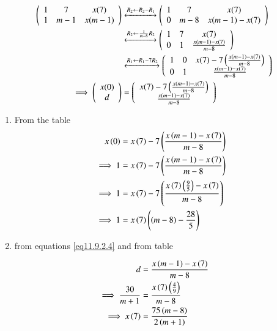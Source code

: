 \documentclass[journal,12pt,onecolumn]{IEEEtran}
\theoremstyle{remark}
\begin{document}
\begin{align}
\left(
\begin{array}{ccc}
1 & 7 & x(7) \\
1 & m-1 & x(m-1)
\end{array}
\right)
&\xleftrightarrow[]{R_2 \leftarrow R_2-R_1}
\left(
\begin{array}{ccc}
1 & 7 & x(7) \\
0 & m-8 & x(m-1)-x(7)
\end{array}
\right)
\\
&\xleftrightarrow[]{R_2 \leftarrow \frac{1}{m-8}R_2}
\left(
\begin{array}{ccc}
1 & 7 & x(7) \\
0 & 1 & \frac{x(m-1)-x(7)}{m-8}
\end{array}
\right)
\\
&\xleftrightarrow[]{R_1 \leftarrow R_1-7R_2}
\left(
\begin{array}{ccc}
1 & 0 & x(7)-7\left(\frac{x(m-1)-x(7)}{m-8}\right) \\
0 & 1 & \frac{x(m-1)-x(7)}{m-8}
\end{array}
\right)
\\
\implies \left(
\begin{array}{c}
x(0) \\
d
\end{array}
\right)
&=
\left(
\begin{array}{c}
x(7)-7\left(\frac{x(m-1)-x(7)}{m-8}\right) \\
\frac{x(m-1)-x(7)}{m-8}
\end{array}
\right)
\end{align}
\begin{enumerate}
    \item From the table\\
\begin{align}
    x\left(0\right)&=x\left(7\right)-7\left(\frac{x\left(m-1\right)-x\left(7\right)}{m-8}\right)\\
    \implies1&=x\left(7\right)-7\left(\frac{x\left(m-1\right)-x\left(7\right)}{m-8}\right)\\
    \implies1&=x\left(7\right)-7\left(\frac{x\left(7\right)\left(\frac{9}{5}\right)-x\left(7\right)}{m-8}\right)\\
    \implies1&=x\left(7\right)\left(\left(m-8\right)-\frac{28}{5}\right) \label{eq11.9.2.14}
\end{align}
\item from equations \eqref{eq11.9.2.4} and from table\\
\end{enumerate}
 \begin{align}
    d&=\frac{x\left(m-1\right)-x\left(7\right)}{m-8}\\
    \implies\frac{30}{m+1}&=\frac{x\left(7\right)\left(\frac{4}{9}\right)}{m-8}\\ \label{eq11.9.2.17}
    \implies x\left(7\right)&=\frac{75\left(m-8\right)}{2\left(m+1\right)}
 \end{align}
\end{document}

